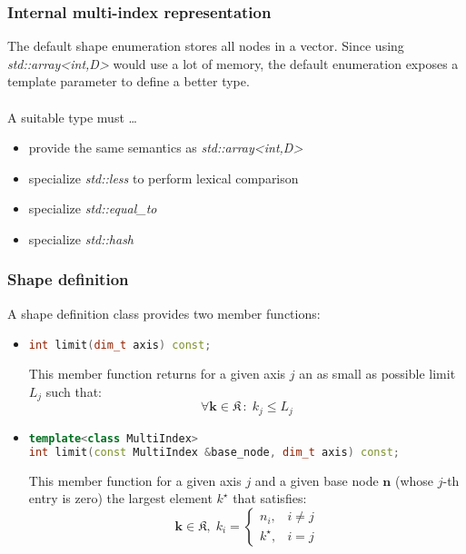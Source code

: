 \documentclass{article}
\begin{document}
\subsubsection{Internal multi-index representation}
The default shape enumeration stores all nodes in a vector. Since using \emph{std::array\textless int,D\textgreater} would use a lot of memory, the default enumeration exposes a template parameter to define a better type. \\ \\ A suitable type must \dots
\begin{itemize}
\item provide the same semantics as \emph{std::array\textless int,D\textgreater}
\item specialize \emph{std::less} to perform lexical comparison
\item specialize \emph{std::equal\_to}
\item specialize \emph{std::hash}
\end{itemize}

\subsubsection{Shape definition}
A shape definition class provides two member functions:

\begin{itemize}
\item
\begin{lstlisting}[language=C++, caption={}]
int limit(dim_t axis) const;
\end{lstlisting}
This member function returns for a given axis \( j \) an as small as possible limit \( L_j \) such that:
\[ \forall \boldsymbol{k} \in \mathfrak{K} \,\colon\; k_j \leq L_j \]

\item
\begin{lstlisting}[language=C++, caption={}]
template<class MultiIndex>
int limit(const MultiIndex &base_node, dim_t axis) const;
\end{lstlisting}
This member function for a given axis \( j \) and a given base node \( \boldsymbol{n} \) (whose \( j \)-th entry is zero)
the largest element \( k^\star \) that satisfies: 
\[ \boldsymbol{k} \in \mathfrak{K}, \;
k_i =
   \begin{cases}
      n_i,& i \neq j\\
      k^\star, & i = j
   \end{cases}
\]

\end{itemize}
\end{document}
